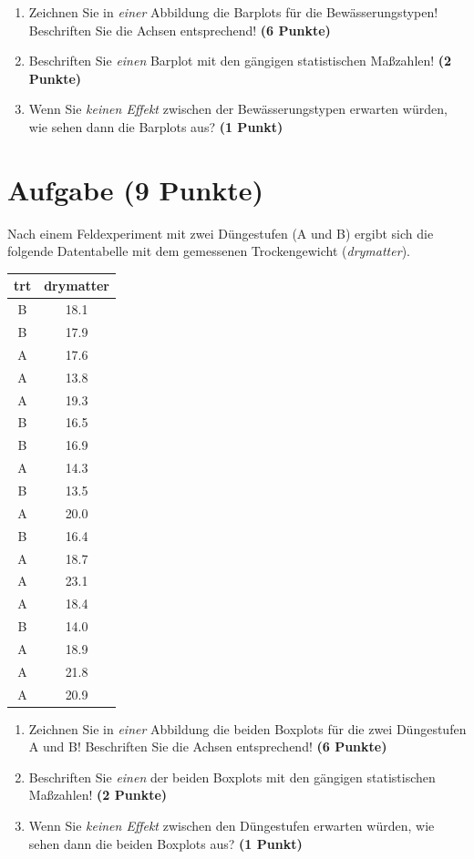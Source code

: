 \documentclass[a4paper, 10pt]{scrartcl}\usepackage[]{graphicx}\usepackage[]{color}
\begin{document}
\begin{enumerate}
\item Zeichnen Sie in \textit{einer} Abbildung die Barplots f{\"u}r die
  Bew{\"a}sserungstypen! Beschriften Sie die Achsen entsprechend!
  \textbf{(6 Punkte)}
\item Beschriften Sie \textit{einen} Barplot mit den g{\"a}ngigen
  statistischen Ma{\ss}zahlen! \textbf{(2 Punkte)}
\item Wenn Sie \textit{keinen Effekt} zwischen der Bew{\"a}sserungstypen erwarten
  w{\"u}rden, wie sehen dann die Barplots aus? \textbf{(1 Punkt)}
\end{enumerate} 
\clearpage

\section{Aufgabe \hfill (9 Punkte)}

Nach einem Feldexperiment mit zwei D{\"u}ngestufen (A und B) ergibt sich die
folgende Datentabelle mit dem gemessenen Trockengewicht (\textit{drymatter}). 

\begin{table}[!h]
\centering
\begin{tabular}{cc}
\toprule
trt & drymatter\\
\midrule
B & 18.1\\
B & 17.9\\
A & 17.6\\
A & 13.8\\
A & 19.3\\
\addlinespace
B & 16.5\\
B & 16.9\\
A & 14.3\\
B & 13.5\\
A & 20.0\\
\addlinespace
B & 16.4\\
A & 18.7\\
A & 23.1\\
A & 18.4\\
B & 14.0\\
\addlinespace
A & 18.9\\
A & 21.8\\
A & 20.9\\
\bottomrule
\end{tabular}
\end{table}



\begin{enumerate}
\item Zeichnen Sie in \textit{einer} Abbildung die beiden Boxplots f{\"u}r die
  zwei D{\"u}ngestufen A und B! Beschriften Sie die Achsen entsprechend!
  \textbf{(6 Punkte)}
\item Beschriften Sie \textit{einen} der beiden Boxplots mit den g{\"a}ngigen
  statistischen Ma{\ss}zahlen! \textbf{(2 Punkte)}
\item Wenn Sie \textit{keinen Effekt} zwischen den D{\"u}ngestufen erwarten
  w{\"u}rden, wie sehen dann die beiden Boxplots aus? \textbf{(1 Punkt)}
\end{enumerate} 
\clearpage
\end{document}
